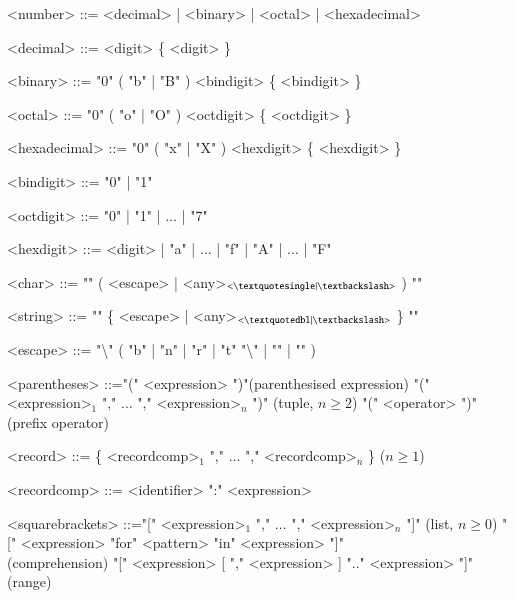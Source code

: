 \documentclass{article}
\begin{document}
\begin{grammar}
  <number> ::= <decimal> | <binary> | <octal> | <hexadecimal>

  <decimal> ::= <digit> \{ <digit> \}

  <binary> ::= "0" ( "b" | "B" ) <bindigit> \{ <bindigit> \}

  <octal> ::= "0" ( "o" | "O" ) <octdigit> \{ <octdigit> \}

  <hexadecimal> ::= "0" ( "x" | "X" ) <hexdigit> \{ <hexdigit> \}

  <bindigit> ::= "0" | "1"

  <octdigit> ::= "0" | "1" | $\ldots$ | "7"

  <hexdigit> ::= <digit> | "a" | $\ldots$ | "f" | "A" | $\ldots$ | "F"
\end{grammar}

\begin{grammar}
  <char> ::= "\textquotesingle" ( <escape> | <any>$_{<\textquotesingle  | \textbackslash>}$ ) "\textquotesingle"

  <string> ::= "\textquotedbl" \{ <escape> | <any>$_{<\textquotedbl | \textbackslash>}$ \} "\textquotedbl"

  <escape> ::= "\textbackslash" ( "b" | "n" | "r" | "t" "\textbackslash" | "\textquotedbl" | "\textquotesingle" )
\end{grammar}

\begin{grammar}
  <parentheses> ::="(" \textvisiblespace <expression> ")"\textvisiblespace \hfill (parenthesised expression)
  \alt "(" \textvisiblespace <expression>$_1$ "," \textvisiblespace $\ldots$ "," \textvisiblespace <expression>$_n$ ")" \textvisiblespace \hfill (tuple, $n \geq 2$)
  \alt "(" \textvisiblespace <operator> \textvisiblespace ")"\textvisiblespace \hfill (prefix operator)
\end{grammar}

\begin{grammar}
  <record> ::= \{ \textvisiblespace <recordcomp>$_1$ "," \textvisiblespace $\ldots$ "," \textvisiblespace <recordcomp>$_n$ \} \textvisiblespace \hfill ($n \geq 1$)

  <recordcomp> ::= <identifier> \textvisiblespace ":" \textvisiblespace <expression>
\end{grammar}

\begin{grammar}
  <squarebrackets> ::="[" \textvisiblespace <expression>$_1$ "," \textvisiblespace $\ldots$ "," \textvisiblespace <expression>$_n$ "]" \textvisiblespace \hfill (list, $n \geq 0$)
  \alt "[" \textvisiblespace <expression> "for" \textvisiblespace <pattern> "in" <expression> "]" \textvisiblespace
  \\ \hfill (comprehension)
  \alt "[" \textvisiblespace <expression> [ "," \textvisiblespace <expression> ] ".." \textvisiblespace <expression> "]" \textvisiblespace \hfill (range)
\end{grammar}
\end{document}
